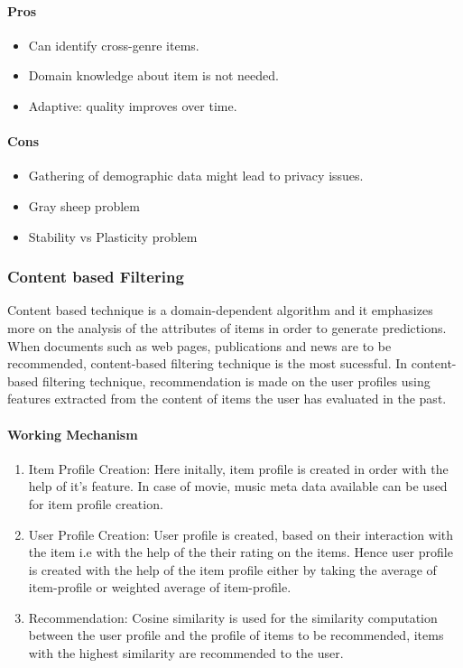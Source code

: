 \paragraph{Pros}\hfill
\begin{itemize}
	\item Can identify cross-genre items.
	\item Domain knowledge about item is not needed.
	\item Adaptive: quality improves over time.
\end{itemize}
\paragraph{Cons}\hfill
\begin{itemize}
	\item Gathering of demographic data might lead to privacy issues.
	\item Gray sheep problem
	\item Stability vs Plasticity problem
	
\end{itemize}
\subsubsection{Content based Filtering}
Content based technique \cite{recommend} is a domain-dependent algorithm and it emphasizes more on the analysis of the attributes of items in order to generate predictions. When documents such as web pages, publications and news are to be recommended, content-based filtering technique is the most sucessful. In content-based filtering technique, recommendation is made on the user profiles using features extracted from the content of items the user has evaluated in the past. 
\paragraph{Working Mechanism}\hfill

\begin{enumerate}
	\item Item Profile Creation: Here initally, item profile is created in order with the help of it's feature. In case of movie, music meta data available can be used for item profile creation.
	\item User Profile Creation: User profile is created, based on their interaction with the item i.e with the help of the their rating on the items. Hence user profile is created with the help of the item profile either by taking the average of item-profile or weighted average of item-profile.
	\item Recommendation: Cosine similarity is used for the similarity computation between the user profile and the profile of items to be recommended, items with the highest similarity are recommended to the user. 
\end{enumerate}

